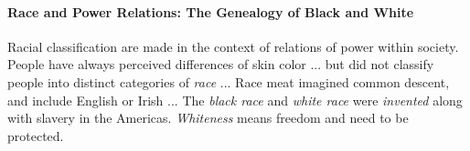 \documentclass{article}
\begin{document}
	\paragraph{Race and Power Relations: The Genealogy of Black and White} \quad
	\newline Racial classification are made in the context of relations of power within society.
	\newline People have always perceived differences of skin color ...
	\newline but did not classify people into distinct categories of \emph{race} ...
	\newline Race meat imagined common descent, and include English or Irish ...
	\newline The \emph{black race} and \emph{white race} were \emph{invented} along with slavery in the Americas.
	\newline \emph{Whiteness} means freedom and need to be protected.
\end{document}
